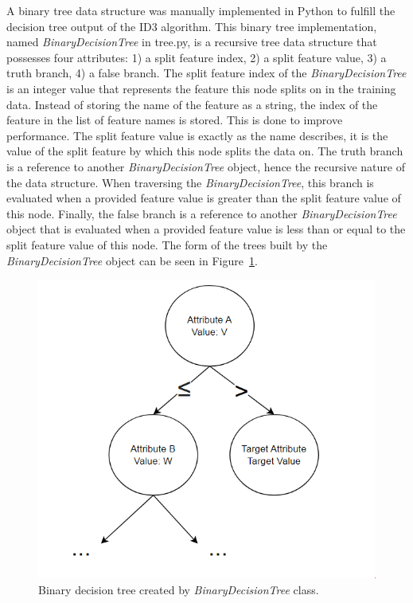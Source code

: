 \documentclass[a4paper]{article}
\begin{document}
A binary tree data structure was manually implemented in Python to fulfill the decision tree output of the ID3 algorithm. This binary tree implementation, named \textit{BinaryDecisionTree} in tree.py, is a recursive tree data structure that possesses four attributes: 1) a split feature index, 2) a split feature value, 3) a truth branch, 4) a false branch. The split feature index of the \textit{BinaryDecisionTree} is an integer value that represents the feature this node splits on in the training data. Instead of storing the name of the feature as a string, the index of the feature in the list of feature names is stored. This is done to improve performance. The split feature value is exactly as the name describes, it is the value of the split feature by which this node splits the data on. The truth branch is a reference to another \textit{BinaryDecisionTree} object, hence the recursive nature of the data structure. When traversing the \textit{BinaryDecisionTree}, this branch is evaluated when a provided feature value is greater than the split feature value of this node. Finally, the false branch is a reference to another \textit{BinaryDecisionTree} object that is evaluated when a provided feature value is less than or equal to the split feature value of this node. The form of the trees built by the \textit{BinaryDecisionTree} object can be seen in Figure~\ref{fig:binary-decision-tree}. 

\begin{figure}[h]
    \centering
    \includegraphics[scale=0.55]{images/binary-decision-tree.PNG}
    \caption{Binary decision tree created by \textit{BinaryDecisionTree} class.}
    \label{fig:binary-decision-tree}
\end{figure}
\end{document}
